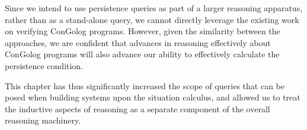 Since we intend to use persistence queries as part of a larger reasoning
apparatus, rather than as a stand-alone query, we cannot directly
leverage the existing work on verifying ConGolog programs. However,
given the similarity between the approaches, we are confident that
advances in reasoning effectively about ConGolog programs will also
advance our ability to effectively calculate the persistence condition.

This chapter has thus significantly increased the scope of queries
that can be posed when building systems upon the situation calculus,
and allowed us to treat the inductive aspects of reasoning as a separate
component of the overall reasoning machinery.

